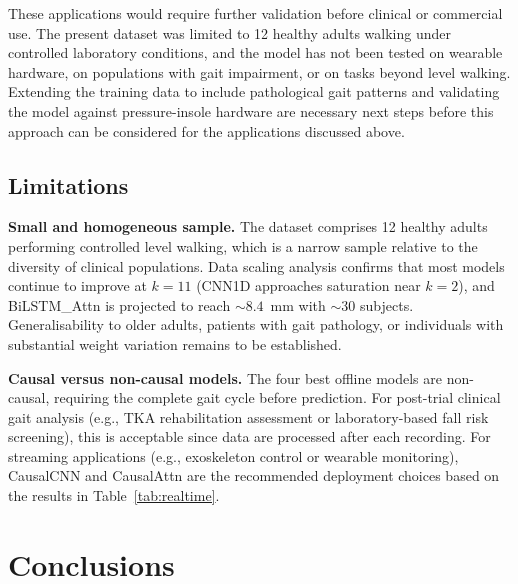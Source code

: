 \documentclass[preprint,12pt]{elsarticle}
\begin{document}
These applications would require further validation before clinical or commercial
use.
The present dataset was limited to 12 healthy adults walking under controlled
laboratory conditions, and the model has not been tested on wearable hardware, on
populations with gait impairment, or on tasks beyond level walking.
Extending the training data to include pathological gait patterns and validating
the model against pressure-insole hardware are necessary next steps before this
approach can be considered for the applications discussed above.

\subsection{Limitations}
\label{subsec:limits}

\textbf{Small and homogeneous sample.}
The dataset comprises 12 healthy adults performing controlled level walking, which
is a narrow sample relative to the diversity of clinical populations.
Data scaling analysis confirms that most models continue to improve at $k = 11$
(CNN1D approaches saturation near $k = 2$), and BiLSTM\_Attn is projected to
reach ${\sim}8.4$~mm with ${\sim}30$ subjects.
Generalisability to older adults, patients with gait pathology, or individuals
with substantial weight variation remains to be established.

\textbf{Causal versus non-causal models.}
The four best offline models are non-causal, requiring the complete gait cycle
before prediction.
For post-trial clinical gait analysis (e.g., TKA rehabilitation assessment or
laboratory-based fall risk screening), this is acceptable since data are processed
after each recording.
For streaming applications (e.g., exoskeleton control or wearable monitoring),
CausalCNN and CausalAttn are the recommended deployment choices based on the
results in Table~\ref{tab:realtime}.

\section{Conclusions}
\label{sec:conclusion}
\end{document}
